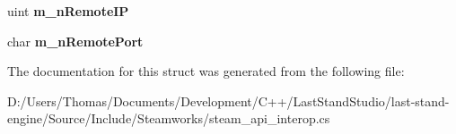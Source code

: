 \begin{DoxyCompactItemize}
\item 
\hypertarget{structValve_1_1Steamworks_1_1P2PSessionState__t_abbd40b1294c090e707022774bf9c2e2c}{}uint {\bfseries m\+\_\+n\+Remote\+I\+P}\label{structValve_1_1Steamworks_1_1P2PSessionState__t_abbd40b1294c090e707022774bf9c2e2c}

\item 
\hypertarget{structValve_1_1Steamworks_1_1P2PSessionState__t_a9b9b31010bd88725272f8a39aa3b790f}{}char {\bfseries m\+\_\+n\+Remote\+Port}\label{structValve_1_1Steamworks_1_1P2PSessionState__t_a9b9b31010bd88725272f8a39aa3b790f}

\end{DoxyCompactItemize}


The documentation for this struct was generated from the following file\+:\begin{DoxyCompactItemize}
\item 
D\+:/\+Users/\+Thomas/\+Documents/\+Development/\+C++/\+Last\+Stand\+Studio/last-\/stand-\/engine/\+Source/\+Include/\+Steamworks/steam\+\_\+api\+\_\+interop.\+cs\end{DoxyCompactItemize}
